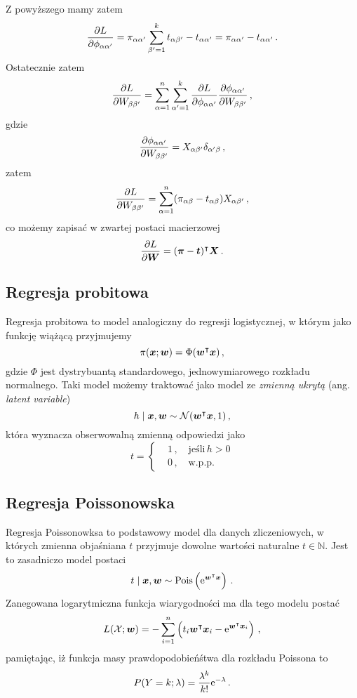 \documentclass{myclass}
\begin{document}
Z powyższego mamy zatem
\[
    \pdv{L}{\phi_{\alpha\alpha'}} = \pi_{\alpha\alpha'} \sum_{\beta'=1}^k t_{\alpha\beta'} - t_{\alpha\alpha'} = \pi_{\alpha\alpha'} - t_{\alpha\alpha'}\,.
\]
Ostatecznie zatem
\[
    \pdv{L}{W_{\beta\beta'}} = \sum_{\alpha=1}^n \sum_{\alpha'=1}^k \pdv{L}{\phi_{\alpha\alpha'}} \pdv{\phi_{\alpha\alpha'}}{W_{\beta\beta'}}\,,
\]
gdzie
\[
    \pdv{\phi_{\alpha\alpha'}}{W_{\beta\beta'}} = X_{\alpha\beta'} \delta_{\alpha'\beta}\,,
\]
zatem
\[
    \pdv{L}{W_{\beta\beta'}} = \sum_{\alpha=1}^n (\pi_{\alpha\beta} - t_{\alpha\beta}) X_{\alpha\beta'}\,,
\]
co możemy zapisać w zwartej postaci macierzowej
\[
    \pdv{L}{\bm{W}} = (\bm{\pi} - \bm{t})^\intercal \bm{X}\,.
\]

\subsection{Regresja probitowa}

Regresja probitowa to model analogiczny do regresji logistycznej, w którym jako funkcję wiążącą
przyjmujemy
\[
    \pi(\bm{x}; \bm{w}) = \Phi(\bm{w}^\intercal \bm{x})\,,
\]
gdzie $\Phi$ jest dystrybuantą standardowego, jednowymiarowego rozkładu normalnego. Taki model
możemy traktować jako model ze \emph{zmienną ukrytą} (ang. \emph{latent variable})
\[
    h \mid \bm{x}, \bm{w} \sim \mathcal{N}(\bm{w}^\intercal \bm{x}, 1)\,,
\]
która wyznacza obserwowalną zmienną odpowiedzi jako
\[
    t = \begin{cases}
        &1\,,\quad\text{jeśli}\,h > 0\\
        &0\,,\quad\text{w.p.p.}
    \end{cases}
\]

\subsection{Regresja Poissonowska}

Regresja Poissonowksa to podstawowy model dla danych zliczeniowych, w których zmienna objaśniana $t$
przyjmuje dowolne wartości naturalne $t \in \mathbb{N}$. Jest to zasadniczo model postaci
\[
    t \mid \bm{x}, \bm{w} \sim \text{Pois}\left(\mathrm{e}^{\bm{w}^\intercal \bm{x}}\right)\,.
\]
Zanegowana logarytmiczna funkcja wiarygodności ma dla tego modelu postać
\[
    L(\mathcal{X}; \bm{w}) = - \sum_{i=1}^n \left( t_i \bm{w}^\intercal \bm{x}_i - \mathrm{e}^{\bm{w}^\intercal \bm{x}_i}\right)\,,
\]
pamiętając, iż funkcja masy prawdopodobieńśtwa dla rozkładu Poissona to
\[
    P(Y = k; \lambda) = \frac{\lambda^k}{k!} \mathrm{e}^{-\lambda}\,.
\]
\end{document}
